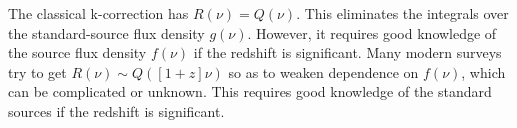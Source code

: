 \documentclass[12pt,preprint]{aastex}
\begin{document}
The classical k-correction has $R(\nu)=Q(\nu)$.  This eliminates the
integrals over the standard-source flux density $g(\nu)$.  However, it
requires good knowledge of the source flux density $f(\nu)$ if the
redshift is significant.  Many modern surveys try to get $R(\nu)\sim
Q([1+z]\nu)$ so as to weaken dependence on $f(\nu)$, which can be
complicated or unknown.  This requires good knowledge of the standard
sources if the redshift is significant.



\end{document}
